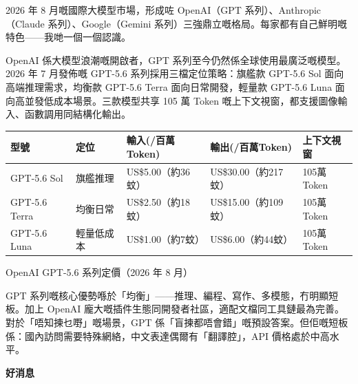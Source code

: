 


2026 年 8 月嘅國際大模型市場，形成咗 OpenAI（GPT 系列）、Anthropic（Claude 系列）、Google（Gemini 系列）三強鼎立嘅格局。每家都有自己鮮明嘅特色——我哋一個一個認識。


OpenAI 係大模型浪潮嘅開啟者，GPT 系列至今仍然係全球使用最廣泛嘅模型。2026 年 7 月發佈嘅 GPT-5.6 系列採用三檔定位策略：旗艦款 GPT-5.6 Sol 面向高端推理需求，均衡款 GPT-5.6 Terra 面向日常開發，輕量款 GPT-5.6 Luna 面向高並發低成本場景。三款模型共享 105 萬 Token 嘅上下文視窗，都支援圖像輸入、函數調用同結構化輸出。

\begin{center}
\begin{tabularx}{\linewidth}{|X|X|X|X|X|}
\hline
\textbf{型號} & \textbf{定位} & \textbf{輸入(/百萬Token)} & \textbf{輸出(/百萬Token)} & \textbf{上下文視窗} \tabularnewline
\hline
GPT-5.6 Sol & 旗艦推理 & US\$5.00（約36蚊） & US\$30.00（約217蚊） & 105萬Token \tabularnewline
GPT-5.6 Terra & 均衡日常 & US\$2.50（約18蚊） & US\$15.00（約109蚊） & 105萬Token \tabularnewline
GPT-5.6 Luna & 輕量低成本 & US\$1.00（約7蚊） & US\$6.00（約44蚊） & 105萬Token \tabularnewline
\hline
\end{tabularx}
\end{center}

\begin{center}\small\color{gray}OpenAI GPT-5.6 系列定價（2026 年 8 月）\end{center}

GPT 系列嘅核心優勢喺於「均衡」——推理、編程、寫作、多模態，冇明顯短板。加上 OpenAI 龐大嘅插件生態同開發者社區，適配文檔同工具鏈最為完善。對於「唔知揀乜嘢」嘅場景，GPT 係「盲揀都唔會錯」嘅預設答案。但佢嘅短板係：國內訪問需要特殊網絡，中文表達偶爾有「翻譯腔」，API 價格處於中高水平。

\textbf{好消息}\par


